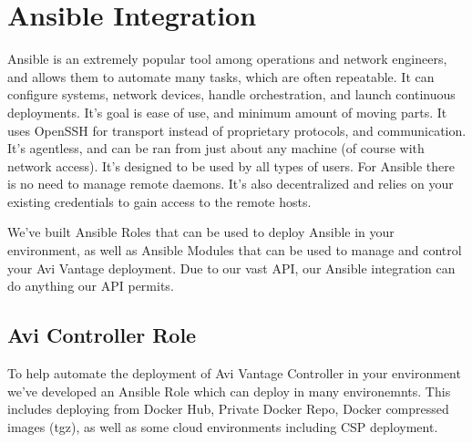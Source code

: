 \documentclass[letterpaper,10pt,english]{sphinxmanual}
\begin{document}
\section{Ansible Integration}
\label{\detokenize{integrations/ansible/index:ansible-integration}}\label{\detokenize{integrations/ansible/index::doc}}
Ansible is an extremely popular tool among operations and network engineers, and allows them to automate many tasks, which are often repeatable. It can configure systems, network devices, handle orchestration, and launch continuous deployments. It's goal is ease of use, and minimum amount of moving parts. It uses OpenSSH for transport instead of proprietary protocols, and communication. It's agentless, and can be ran from just about any machine (of course with network access). It's designed to be used by all types of users. For Ansible there is no need to manage remote daemons. It's also decentralized and relies on your existing credentials to gain access to the remote hosts.

We've built Ansible Roles that can be used to deploy Ansible in your environment, as well as Ansible Modules that can be used to manage and control your Avi Vantage deployment. Due to our vast API, our Ansible integration can do anything our API permits.


\subsection{Avi Controller Role}
\label{\detokenize{integrations/ansible/controller::doc}}\label{\detokenize{integrations/ansible/controller:avi-controller-role}}
To help automate the deployment of Avi Vantage Controller in your environment we've developed an Ansible Role which can deploy in many environemnts. This includes deploying from Docker Hub, Private Docker Repo, Docker compressed images (tgz), as well as some cloud environments including CSP deployment.
\end{document}
